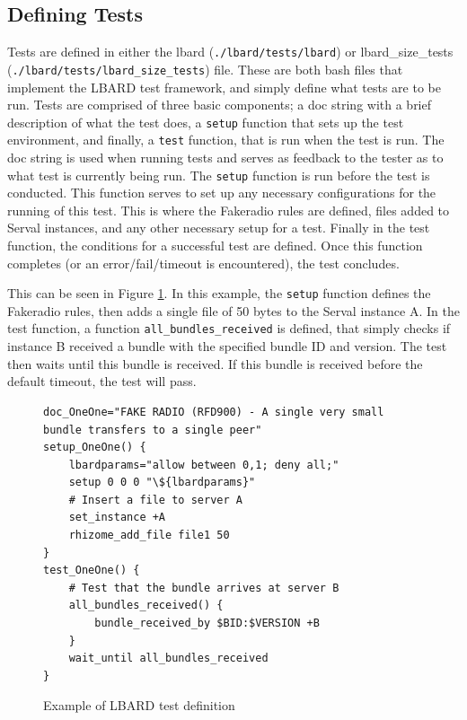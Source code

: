 \subsection{Defining Tests}
Tests are defined in either the lbard (\texttt{./lbard/tests/lbard}) or lbard\_size\_tests (\texttt{./lbard/tests/lbard\_size\_tests}) file. 
These are both bash files that implement the LBARD test framework, and simply define what tests are to be run.
Tests are comprised of three basic components; a doc string with a brief description of what the test does, a \texttt{setup} function that sets up the test environment, and finally, a \texttt{test} function, that is run when the test is run.
The doc string is used when running tests and serves as feedback to the tester as to what test is currently being run.
The \texttt{setup} function is run before the test is conducted. This function serves to set up any necessary configurations for the running of this test. This is where the Fakeradio rules are defined, files added to Serval instances, and any other necessary setup for a test.
Finally in the test function, the conditions for a successful test are defined. Once this function completes (or an error/fail/timeout is encountered), the test concludes.


This can be seen in Figure \ref{fig:testDefinition}. 
In this example, the \texttt{setup} function defines the Fakeradio rules, then adds a single file of 50 bytes to the Serval instance A. 
In the test function, a function \texttt{all\_bundles\_received} is defined, that simply checks if instance B received a bundle with the specified bundle ID and version. 
The test then waits until this bundle is received. 
If this bundle is received before the default timeout, the test will pass.

\lstset{language=bash,
showstringspaces=false,
numbers=left,
}

\begin{figure}
    \begin{centering}

\begin{lstlisting}[breaklines, frame=single]
doc_OneOne="FAKE RADIO (RFD900) - A single very small bundle transfers to a single peer"
setup_OneOne() {
    lbardparams="allow between 0,1; deny all;"
    setup 0 0 0 "\${lbardparams}" 
    # Insert a file to server A
    set_instance +A
    rhizome_add_file file1 50
}
test_OneOne() {
    # Test that the bundle arrives at server B
    all_bundles_received() {
        bundle_received_by $BID:$VERSION +B 
    }
    wait_until all_bundles_received
} 
\end{lstlisting}
        \caption{Example of LBARD test definition}
        \label{fig:testDefinition}
    \end{centering}
\end{figure}

